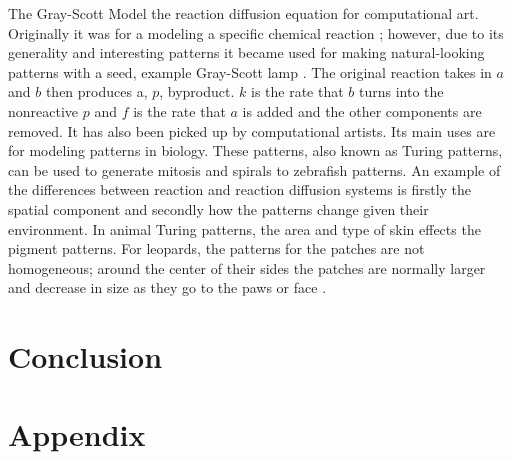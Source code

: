 \documentclass[12pt, letterpaper]{article}
\begin{document}
The Gray-Scott Model the reaction diffusion equation for computational art. Originally it was for a modeling
a specific chemical reaction \citep{grayscott}; however, due to its generality and interesting patterns it
became used for making natural-looking patterns with a seed, example Gray-Scott lamp \citep{reactionLamp}. 
The original reaction takes in $a$ and $b$ then produces a, $p$, byproduct. $k$ is the rate that $b$ turns
into the nonreactive $p$ and $f$ is the rate that $a$ is added and the other components are removed.
It has also been picked up by computational artists. Its main uses are for modeling patterns in biology.
These
patterns, also known as Turing patterns, can be used to generate mitosis and spirals to zebrafish patterns. An example of the
differences between reaction and reaction diffusion systems is firstly the spatial component and secondly how
the patterns change given their environment. In animal Turing patterns, the area and type of skin effects the
pigment patterns. For leopards, the patterns for the patches are not homogeneous; around the center of their
sides the patches are normally larger and decrease in size as they go to the paws or face \citep{turingsCat}.

\section{Conclusion}




\newpage
\section{Appendix}

\listoffigures










\end{document}
